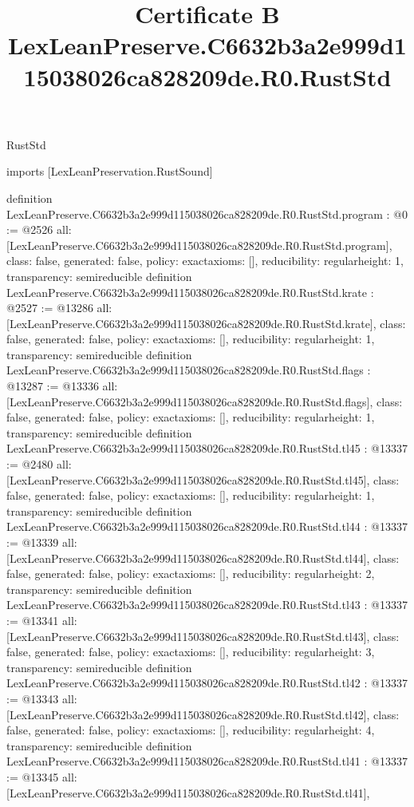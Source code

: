 \begin{lexlean}{RustStd}
\title{Certificate B LexLeanPreserve.C6632b3a2e999d115038026ca828209de.R0.RustStd}
\begin{coremodule}
imports [LexLeanPreservation.RustSound]

definition LexLeanPreserve.C6632b3a2e999d115038026ca828209de.R0.RustStd.program : @0 := @2526 {
  all: [LexLeanPreserve.C6632b3a2e999d115038026ca828209de.R0.RustStd.program],
  class: false,
  generated: false,
  policy: exact{axioms: []},
  reducibility: regular{height: 1},
  transparency: semireducible
}
definition LexLeanPreserve.C6632b3a2e999d115038026ca828209de.R0.RustStd.krate : @2527 := @13286 {
  all: [LexLeanPreserve.C6632b3a2e999d115038026ca828209de.R0.RustStd.krate],
  class: false,
  generated: false,
  policy: exact{axioms: []},
  reducibility: regular{height: 1},
  transparency: semireducible
}
definition LexLeanPreserve.C6632b3a2e999d115038026ca828209de.R0.RustStd.flags : @13287 := @13336 {
  all: [LexLeanPreserve.C6632b3a2e999d115038026ca828209de.R0.RustStd.flags],
  class: false,
  generated: false,
  policy: exact{axioms: []},
  reducibility: regular{height: 1},
  transparency: semireducible
}
definition LexLeanPreserve.C6632b3a2e999d115038026ca828209de.R0.RustStd.tl45 : @13337 := @2480 {
  all: [LexLeanPreserve.C6632b3a2e999d115038026ca828209de.R0.RustStd.tl45],
  class: false,
  generated: false,
  policy: exact{axioms: []},
  reducibility: regular{height: 1},
  transparency: semireducible
}
definition LexLeanPreserve.C6632b3a2e999d115038026ca828209de.R0.RustStd.tl44 : @13337 := @13339 {
  all: [LexLeanPreserve.C6632b3a2e999d115038026ca828209de.R0.RustStd.tl44],
  class: false,
  generated: false,
  policy: exact{axioms: []},
  reducibility: regular{height: 2},
  transparency: semireducible
}
definition LexLeanPreserve.C6632b3a2e999d115038026ca828209de.R0.RustStd.tl43 : @13337 := @13341 {
  all: [LexLeanPreserve.C6632b3a2e999d115038026ca828209de.R0.RustStd.tl43],
  class: false,
  generated: false,
  policy: exact{axioms: []},
  reducibility: regular{height: 3},
  transparency: semireducible
}
definition LexLeanPreserve.C6632b3a2e999d115038026ca828209de.R0.RustStd.tl42 : @13337 := @13343 {
  all: [LexLeanPreserve.C6632b3a2e999d115038026ca828209de.R0.RustStd.tl42],
  class: false,
  generated: false,
  policy: exact{axioms: []},
  reducibility: regular{height: 4},
  transparency: semireducible
}
definition LexLeanPreserve.C6632b3a2e999d115038026ca828209de.R0.RustStd.tl41 : @13337 := @13345 {
  all: [LexLeanPreserve.C6632b3a2e999d115038026ca828209de.R0.RustStd.tl41],
}
\end{coremodule}
\end{lexlean}
